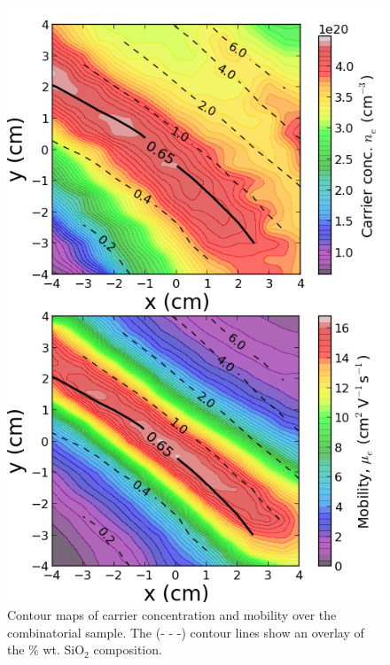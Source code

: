 \documentclass[preprint]{elsarticle}
\begin{document}
\begin{figure}[p]
\centering
\includegraphics[scale=0.5]{figure2.png}
\caption{\label{fig:5} Contour maps of carrier concentration and mobility over the combinatorial sample. The (- - -) contour lines show an overlay of the \% wt. SiO$_{2}$ composition.}
\end{figure}
\end{document}
